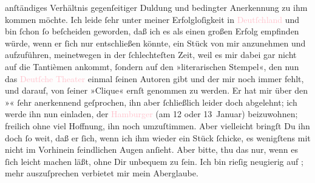                anſtändiges Verhältnis gegenſeitiger Duldung und beding{\pb}ter Anerkennung \introOben{}zu ihm\introOben{}
               kommen möchte. Ich leide ſehr unter meiner Erfolgloſigkeit in \textcolor{pink}{Deutſchland}{}\ledrightnote{\textcolor{pink}{Deutschland}} und bin ſchon ſo beſcheiden geworden, daß ich es als
               einen großen Erfolg empfinden würde, wenn er ſich nur entschließen könnte, ein Stück
               von mir anzunehmen und aufzuführen, meinetwegen in der ſchlechteſten Zeit, weil es
               mir dabei gar nicht auf die Tantièmen ankommt, ſondern auf den »literarischen
               Stempel«, {\pb}den nun das \textcolor{pink}{Deutſche Theater}{}\ledrightnote{\textcolor{pink}{Deutsches Theater Berlin}} einmal ſeinen Autoren gibt und der mir noch immer fehlt,
               und darauf, von ſeiner »Clique« ernſt genommen zu werden. Er hat mir über den
                  »\label{K_L01192_1v}\label{K_L01192_1h}«
               ſehr anerkennend geſprochen, ihn aber ſchließlich leider doch abgelehnt; ich werde
               ihn nun einladen, der \textcolor{pink}{Hamburger}{}\ledrightnote{\textcolor{pink}{Hamburg}}{ }\label{K_L01192_2v}\label{K_L01192_2h} (am 12 oder 13 Januar) beizuwohnen;
               freilich ohne viel Hoffnung, \strikeout{\textcolor{gray}{ohne}} ihn noch {\pb}umzuſtimmen. Aber vielleicht
               bringſt Du ihn doch ſo weit, daß er ſich, wenn ich ihm wieder ein Stück ſchicke, es
               wenigſtens mit nicht im Vorhinein feindlichen Augen anſieht.\pend
           \pstart
           Aber bitte, thu das nur, wenn es ſich leicht machen läßt, ohne Dir unbequem zu
               ſein.\pend
           \pstart
           Ich bin rieſig neugierig auf \label{K_L01192_3v}\label{K_L01192_3h}; mehr
               auszuſprechen verbietet mir mein Aberglaube.\pend
